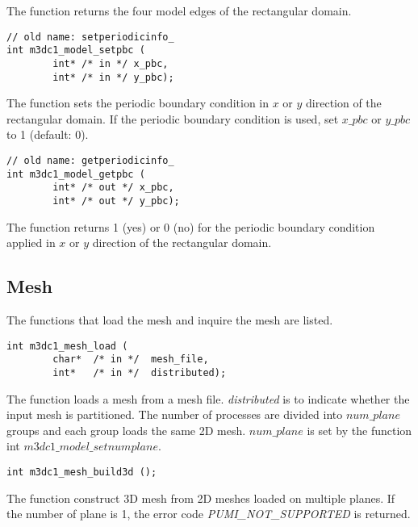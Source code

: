 The function returns the four model edges of the rectangular domain.

\begin{verbatim}
// old name: setperiodicinfo_
int m3dc1_model_setpbc (
        int* /* in */ x_pbc, 
        int* /* in */ y_pbc); 
\end{verbatim}\vspace{-.5cm}\hspace{1cm}

The function sets the periodic boundary condition in $x$ or $y$ direction of the rectangular domain. If the periodic boundary condition is used, set $x\_pbc$ or $y\_pbc$ to 1 (default: 0).
\begin{verbatim}
// old name: getperiodicinfo_
int m3dc1_model_getpbc (
        int* /* out */ x_pbc, 
        int* /* out */ y_pbc); 
\end{verbatim}\vspace{-.5cm}\hspace{1cm}

The function returns 1 (yes) or 0 (no) for the periodic boundary condition applied in $x$ or $y$ direction of the rectangular domain.
\subsection{Mesh}
The functions that load the mesh and inquire the mesh are listed.

\begin{verbatim}
int m3dc1_mesh_load (
        char*  /* in */  mesh_file, 
        int*   /* in */  distributed);
\end{verbatim}\vspace{-.5cm}\hspace{1cm}
 
The function loads a mesh from a mesh file.  \textit{distributed} is to indicate whether the input mesh is partitioned. The number of processes are divided into $num\_plane$ groups and each group loads the same 2D mesh.  $num\_plane$ is set by the function int $m3dc1\_model\_setnumplane$.
 
\begin{verbatim}
int m3dc1_mesh_build3d ();
\end{verbatim}\vspace{-.5cm}\hspace{1cm}
 
The function construct 3D mesh from 2D meshes loaded on multiple planes. If the number of plane is 1, the error code \emph{PUMI\_NOT\_SUPPORTED} is returned.

